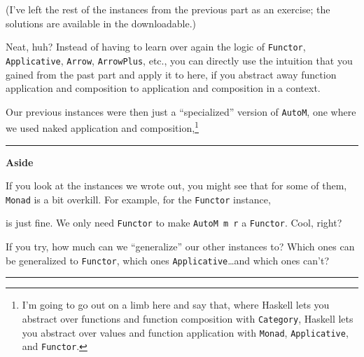 \documentclass[]{article}
\newenvironment{Shaded}{}{}
\newcommand{\DataTypeTok}[1]{\textcolor[rgb]{0.56,0.13,0.00}{#1}}
\newcommand{\FunctionTok}[1]{\textcolor[rgb]{0.02,0.16,0.49}{#1}}
\newcommand{\KeywordTok}[1]{\textcolor[rgb]{0.00,0.44,0.13}{\textbf{#1}}}
\newcommand{\NormalTok}[1]{#1}
\newcommand{\OperatorTok}[1]{\textcolor[rgb]{0.40,0.40,0.40}{#1}}
\newcommand{\OtherTok}[1]{\textcolor[rgb]{0.00,0.44,0.13}{#1}}
\begin{document}
(I've left the rest of the instances from the previous part as an exercise; the
solutions are available in the downloadable.)

Neat, huh? Instead of having to learn over again the logic of \texttt{Functor},
\texttt{Applicative}, \texttt{Arrow}, \texttt{ArrowPlus}, etc., you can directly
use the intuition that you gained from the past part and apply it to here, if
you abstract away function application and composition to application and
composition in a context.

Our previous instances were then just a ``specialized'' version of
\texttt{AutoM}, one where we used naked application and composition,\footnote{I'm
  going to go out on a limb here and say that, where Haskell lets you abstract
  over functions and function composition with \texttt{Category}, Haskell lets
  you abstract over values and function application with \texttt{Monad},
  \texttt{Applicative}, and \texttt{Functor}.}

\begin{center}\rule{0.5\linewidth}{\linethickness}\end{center}

\textbf{Aside}

If you look at the instances we wrote out, you might see that for some of them,
\texttt{Monad} is a bit overkill. For example, for the \texttt{Functor}
instance,

\begin{Shaded}
\end{Shaded}

is just fine. We only need \texttt{Functor} to make \texttt{AutoM\ m\ r} a
\texttt{Functor}. Cool, right?

If you try, how much can we ``generalize'' our other instances to? Which ones
can be generalized to \texttt{Functor}, which ones
\texttt{Applicative}\ldots and which ones can't?

\begin{center}\rule{0.5\linewidth}{\linethickness}\end{center}
\end{document}
